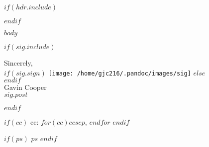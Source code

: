 \documentclass[$size$]{letter}
\newcommand{\header}[0]{
	$if(hdr.include)$
		
	$endif$
    }
\begin{document}
\header

$body$

$if(sig.include)$
    \begin{minipage}[t]{6.5in}
    Sincerely,\\
    $if(sig.sign)$
        \vspace{-0.2in}\texttt{[image: /home/gjc216/.pandoc/images/sig]}
    $else$
        \\
    $endif$
    \\
    Gavin Cooper\\
    $sig.post$
    \end{minipage}
$endif$

$if(cc)$
    cc: $for(cc)$$cc$$sep$, $endfor$
$endif$

$if(ps)$
    $ps$
$endif$
\end{document}
